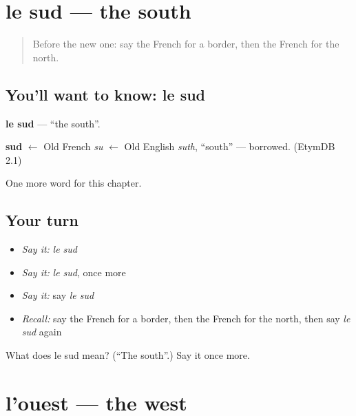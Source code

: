 \section[le sud]{le sud — the south}

\label{lesson:FR-C109-sud}



\begin{quote}
Before the new one: say the French for a border, then the French for the north.
\end{quote}

\subsection*{You'll want to know: le sud}
\textbf{le sud} — \textquotedblleft{}the south\textquotedblright{}.

\begin{cousinweb}
\textbf{sud} $\leftarrow$ Old French \emph{su} $\leftarrow$ Old English \emph{suth}, \textquotedblleft{}south\textquotedblright{} — borrowed. (EtymDB 2.1)
\end{cousinweb}

\begin{grammarlens}[title={What you've built}]
One more word for this chapter.
\end{grammarlens}

\subsection*{Your turn}
\begin{itemize}
\raggedright
  \item \emph{Say it:} \emph{le sud}
  \item \emph{Say it:} \emph{le sud}, once more
  \item \emph{Say it:} say \emph{le sud}
  \item \emph{Recall:} say the French for a border, then the French for the north, then say \emph{le sud} again
\end{itemize}

\begin{tcolorbox}[breakable,colback=teal!4,colframe=teal!35!black,title={Before you move on}]
What does le sud mean? (\textquotedblleft{}The south\textquotedblright{}.) Say it once more.
\end{tcolorbox}
\section[l'ouest]{l'ouest — the west}

